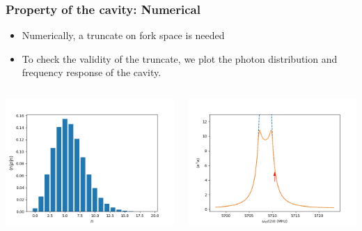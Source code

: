 \documentclass[12pt,hyperref={CJKbookmarks=true}]{beamer}
\begin{document}
\begin{frame}[t]\frametitle{Property of the cavity: Numerical}
\begin{itemize}
	\item Numerically, a truncate on fork space is needed
	\item To check the validity of the truncate, we plot the photon distribution 
	and frequency response of the cavity. 
\end{itemize}
\begin{columns}
\begin{column}{0.5\linewidth}
	\centering
    \includegraphics[width=\textwidth]{figure/photon_number_dist.png}
\end{column}%
\begin{column}{0.5\linewidth}
	\centering
    \includegraphics[width=\textwidth]{figure/resonance.png}
\end{column}
\end{columns}
\end{frame}
\end{document}
